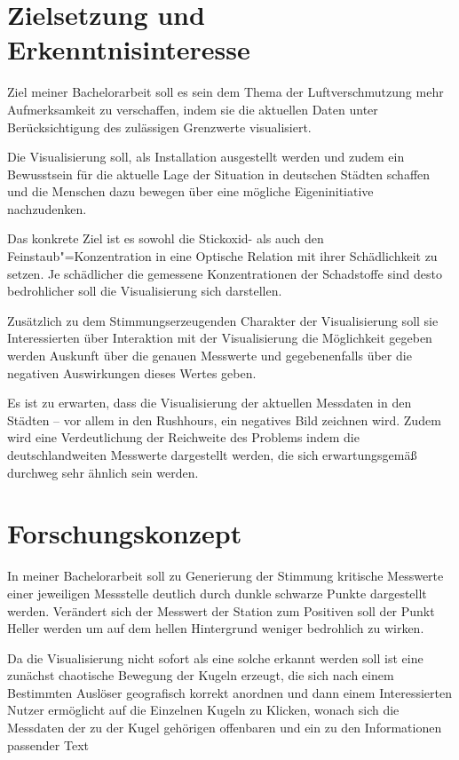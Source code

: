\documentclass[12pt]{article} %
\begin{document}
\section{Zielsetzung und Erkenntnisinteresse} \label{sec:Zielsetzung}

Ziel meiner Bachelorarbeit soll es sein dem Thema der Luftverschmutzung mehr Aufmerksamkeit zu verschaffen, indem sie die aktuellen Daten unter Berücksichtigung des zulässigen Grenzwerte visualisiert.

Die Visualisierung soll, als Installation ausgestellt werden und zudem ein Bewusstsein für die aktuelle Lage der Situation in deutschen Städten schaffen und die Menschen dazu bewegen über eine mögliche Eigeninitiative nachzudenken.

Das konkrete Ziel ist es sowohl die Stickoxid- als auch den Feinstaub"=Konzentration in eine Optische Relation mit ihrer Schädlichkeit zu setzen. Je schädlicher die gemessene Konzentrationen der Schadstoffe sind desto bedrohlicher soll die Visualisierung sich darstellen.

Zusätzlich zu dem Stimmungserzeugenden Charakter der Visualisierung soll sie Interessierten über Interaktion mit der Visualisierung die Möglichkeit gegeben werden Auskunft über die genauen Messwerte und gegebenenfalls über die negativen Auswirkungen dieses Wertes geben.

Es ist zu erwarten, dass die Visualisierung der aktuellen Messdaten in den Städten – vor allem in den Rushhours, ein negatives Bild zeichnen wird.
Zudem wird eine Verdeutlichung der Reichweite des Problems indem die deutschlandweiten Messwerte dargestellt werden, die sich erwartungsgemäß durchweg sehr ähnlich sein werden.

\section{Forschungskonzept} \label{sec:Forschungskonzept}

In meiner Bachelorarbeit soll zu Generierung der Stimmung kritische Messwerte einer jeweiligen Messstelle deutlich durch dunkle schwarze Punkte dargestellt werden. Verändert sich der Messwert der Station zum Positiven soll der Punkt Heller werden um auf dem hellen Hintergrund weniger bedrohlich zu wirken.

Da die Visualisierung nicht sofort als eine solche erkannt werden soll ist eine zunächst chaotische Bewegung der Kugeln erzeugt, die sich nach einem Bestimmten Auslöser geografisch korrekt anordnen und dann einem Interessierten Nutzer ermöglicht auf die Einzelnen Kugeln zu Klicken, wonach sich die Messdaten der zu der Kugel gehörigen offenbaren und ein zu den Informationen passender Text 
\end{document}
